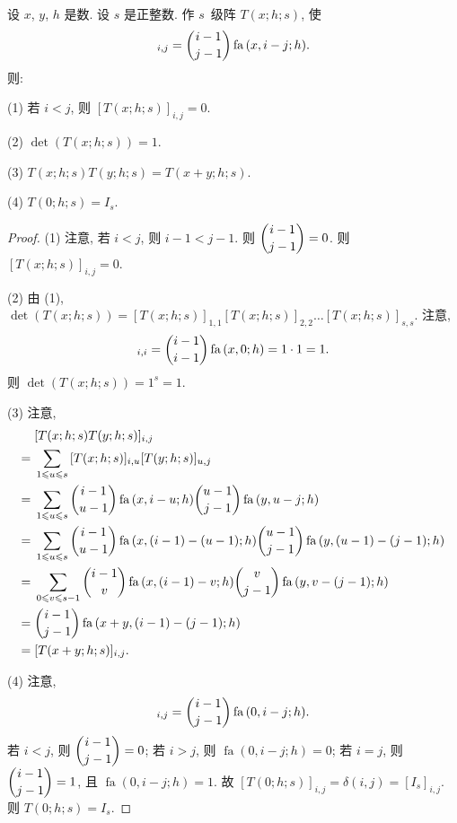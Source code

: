 \documentclass[../libro.tex]{subfiles}
\begin{document}
\begin{theorem}
    设 \(x\), \(y\), \(h\) 是数.
    设 \(s\) 是正整数.
    作 \(s\)~级阵 \(T(x; h; s)\), 使
    \begin{align*}
        [T(x; h; s)]_{i,j} =
        \dbinom{i-1}{j-1} \operatorname{fa} {(x, i - j; h)}.
    \end{align*}
    则:

    (1)
    若 \(i < j\), 则 \([T(x; h; s)]_{i,j} = 0\).

    (2)
    \(\det {(T(x; h; s))} = 1\).

    (3)
    \(T(x; h; s) T(y; h; s) = T(x + y; h; s)\).

    (4)
    \(T(0; h; s) = I_s\).
\end{theorem}

\begin{proof}
    (1)
    注意, 若 \(i < j\), 则 \(i - 1 < j - 1\).
    则 \(\dbinom{i-1}{j-1} = 0\).
    则 \([T(x; h; s)]_{i,j} = 0\).

    (2)
    由 (1),
    \(\det {(T(x; h; s))}
    = [T(x; h; s)]_{1,1} [T(x; h; s)]_{2,2} \dots [T(x; h; s)]_{s,s}\).
    注意,
    \begin{align*}
        [T(x; h; s)]_{i,i}
        = \dbinom{i-1}{i-1} \operatorname{fa} {(x, 0; h)}
        = 1 \cdot 1 = 1.
    \end{align*}
    则 \(\det {(T(x; h; s))} = 1^s = 1\).

    (3)
    注意,
    \begin{align*}
        &
        [T(x; h; s) T(y; h; s)]_{i,j}
        \\
        = {} &
        \sum_{1 \leq u \leq s} {[T(x; h; s)]_{i,u} [T(y; h; s)]_{u,j}}
        \\
        = {} &
        \sum_{1 \leq u \leq s}
        {\dbinom{i-1}{u-1} \operatorname{fa} {(x, i - u; h)}
        \dbinom{u-1}{j-1} \operatorname{fa} {(y, u - j; h)}}
        \\
        = {} &
        \sum_{1 \leq u \leq s}
        {\dbinom{i-1}{u-1} \operatorname{fa} {(x, (i-1) - (u-1); h)}
        \dbinom{u-1}{j-1} \operatorname{fa} {(y, (u-1) - (j-1); h)}}
        \\
        = {} &
        \sum_{0 \leq v \leq s-1}
        {\dbinom{i-1}{v} \operatorname{fa} {(x, (i-1) - v; h)}
        \dbinom{v}{j-1} \operatorname{fa} {(y, v - (j-1); h)}}
        \\
        = {} &
        \dbinom{i-1}{j-1} \operatorname{fa} {(x + y, (i-1) - (j-1); h)}
        \\
        = {} &
        [T(x + y; h; s)]_{i,j}.
    \end{align*}

    (4)
    注意,
    \begin{align*}
        [T(0; h; s)]_{i,j}
        = \dbinom{i-1}{j-1} \operatorname{fa} {(0, i-j; h)}.
    \end{align*}
    若 \(i < j\), 则 \(\dbinom{i-1}{j-1} = 0\);
    若 \(i > j\), 则 \(\operatorname{fa} {(0, i-j; h)} = 0\);
    若 \(i = j\), 则 \(\dbinom{i-1}{j-1} = 1\),
    且 \(\operatorname{fa} {(0, i-j; h)} = 1\).
    故 \([T(0; h; s)]_{i,j} = \delta(i, j) = [I_s]_{i,j}\).
    则 \(T(0; h; s) = I_s\).
\end{proof}
\end{document}
